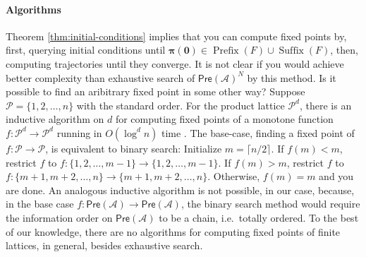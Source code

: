 \documentclass[conference]{ieeeconf}
\newcommand{\A}{\mathcal{A}}
\renewcommand{\P}{\mathcal{P}}
\newcommand{\Pref}{\mathsf{Pre}}
\DeclareMathOperator{\Pre}{Prefix}
\DeclareMathOperator{\Post}{Suffix}
\begin{document}
\paragraph*{Algorithms}
Theorem \ref{thm:initial-conditions} implies that you can compute fixed points by, first, querying initial conditions until $\boldsymbol{\pi(0)} \in \Pre(F) \cup \Post(F)$, then, computing trajectories until they converge. It is not clear if you would achieve better complexity than exhaustive search of $\Pref(\A)^N$ by this method. Is it possible to find an aribitrary fixed point in some other way? Suppose $\P = \{1,2,\dots,n\}$ with the standard order. For the product lattice $\P^d$, there is an inductive algorithm on $d$ for computing fixed points of a monotone function $f: \P^d \to \P^d$ running in $O(\log^d n)$ time \cite{?}. The base-case, finding a fixed point of $f: \P \to \P$, is equivalent to binary search: Initialize $m = \lceil n/2 \rceil$. If $f(m) < m$, restrict $f$ to $f: \{1,2,\dots,m-1\} \to \{1,2,\dots,m-1\}$. If $f(m) > m$, restrict $f$ to $f: \{m+1,m+2,\dots,n\} \to \{m+1,m+2,\dots,n\}$. Otherwise, $f(m) = m$ and you are done. An analogous inductive algorithm is not possible, in our case, because, in the base case $f: \Pref(\A) \to \Pref(\A)$, the binary search method would require the information order on $\Pref(\A)$ to be a chain, i.e.~totally ordered. To the best of our knowledge, there are no algorithms for computing fixed points of finite lattices, in general, besides exhaustive search.
\end{document}
